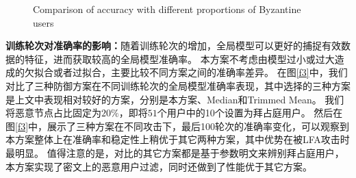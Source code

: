 \begin{figure}[htb]
	\caption{Comparison of accuracy with different proportions of Byzantine users}
	\label{f2}
\end{figure}

\textbf{训练轮次对准确率的影响：}随着训练轮次的增加，全局模型可以更好的捕捉有效数据的特征，进而获取较高的全局模型准确率。
本方案不考虑由模型过小或过大造成的欠拟合或者过拟合，主要比较不同方案之间的准确率差异。
在图\ref{f3}中，我们对比了三种防御方案在不同训练轮次的全局模型准确率表现，其中选择的三种方案是上文中表现相对较好的方案，分别是本方案、Median和Trimmed Mean。
我们将恶意节点占比固定为$20\%$，即将$51$个用户中的10个设置为拜占庭用户。
然后在图\ref{f3}中，展示了三种方案在不同攻击下，最后100轮次的准确率变化，可以观察到本方案整体上在准确率和稳定性上稍优于其它两种方案，其中优势在被LFA攻击时最明显。
值得注意的是，对比的其它方案都是基于参数明文来辨别拜占庭用户，本方案实现了密文上的恶意用户过滤，同时还做到了性能优于其它方案。

